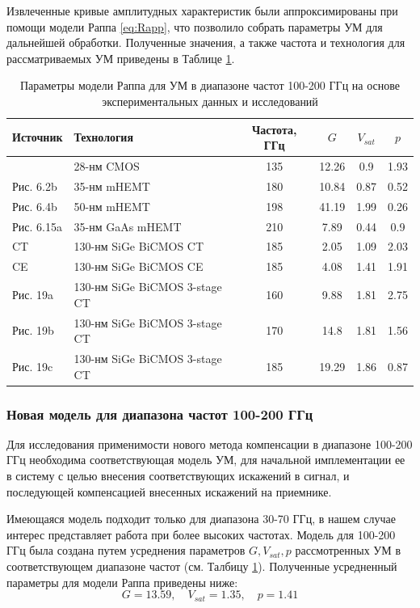 Извлеченные кривые амплитудных характеристик были аппроксимированы при
помощи модели Раппа \ref{eq:Rapp}, что позволило собрать параметры УМ для
дальнейшей обработки. Полученные значения, а также частота и технология
для рассматриваемых УМ приведены в Таблице \ref{tab:pa_params}. 

\begin{table}[h]
    \centering
    \begin{tabular}{llcccc}
        \hline
    Источник              & Технология   & Частота, ГГц & $G$  & $V_{sat}$ & $p$ \\ \hline
    \cite{zhang2021}      & 28-нм CMOS   &  135         & 12.26 & 0.9      & 1.93  \\
    \cite{amadorey2018} Рис. 6.2b  & 35-нм mHEMT      &  180  & 10.84 & 0.87 & 0.52 \\
    \cite{amadorey2018} Рис. 6.4b  & 50-нм mHEMT      &  198  & 41.19 & 1.99 & 0.26  \\
    \cite{amadorey2018} Рис. 6.15a & 35-нм GaAs mHEMT &  210  & 7.89  & 0.44 & 0.9  \\
    \cite{aliyun2020} CT       &  130-нм SiGe BiCMOS CT        & 185 & 2.05  & 1.09 & 2.03  \\
    \cite{aliyun2020} CE       & 130-нм SiGe BiCMOS CE         & 185 & 4.08  & 1.41 & 1.91  \\
    \cite{aliyun2020} Рис. 19a & 130-нм SiGe BiCMOS 3-stage CT & 160 & 9.88  & 1.81 & 2.75  \\
    \cite{aliyun2020} Рис. 19b & 130-нм SiGe BiCMOS 3-stage CT & 170 & 14.8  & 1.81 & 1.56  \\
    \cite{aliyun2020} Рис. 19c & 130-нм SiGe BiCMOS 3-stage CT & 185 & 19.29 & 1.86 & 0.87  \\\hline
    \end{tabular}
    \caption{Параметры модели Раппа для УМ в диапазоне частот 100-200 ГГц
    на основе экспериментальных данных и исследований}
    \label{tab:pa_params}
\end{table}

\subsubsection{Новая модель для диапазона частот 100-200 ГГц}
Для исследования применимости нового метода компенсации в диапазоне 100-200
ГГц необходима соответствующая модель УМ, для начальной имплементации ее в
систему с целью внесения соответствующих искажений в сигнал, и последующей
компенсацией внесенных искажений на приемнике. 

Имеющаяся модель \cite{nokia163314} подходит только для диапазона  30-70
ГГц, в нашем случае интерес представляет работа при более высоких частотах.
Модель для 100-200 ГГц была создана путем усреднения параметров $G,
V_{sat}, p$ рассмотренных УМ в соответствующем диапазоне частот (см. Талбицу
\ref{tab:pa_params}). Полученные усредненный параметры для модели Раппа
приведены ниже:
\begin{equation}
    G = 13.59, \quad V_{sat} = 1.35, \quad p = 1.41
\end{equation}


